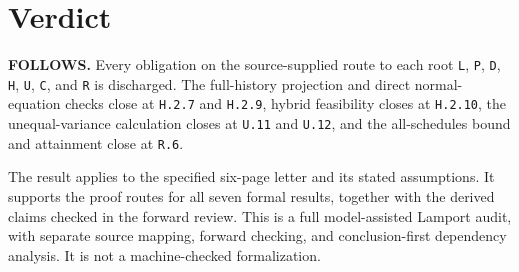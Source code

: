 \documentclass[11pt,letterpaper]{article}
\begin{document}
\section{Verdict}
\textbf{FOLLOWS.} Every obligation on the source-supplied route to each root \texttt{L}, \texttt{P}, \texttt{D}, \texttt{H}, \texttt{U}, \texttt{C}, and \texttt{R} is discharged. The full-history projection and direct normal-equation checks close at \texttt{H.2.7} and \texttt{H.2.9}, hybrid feasibility closes at \texttt{H.2.10}, the unequal-variance calculation closes at \texttt{U.11} and \texttt{U.12}, and the all-schedules bound and attainment close at \texttt{R.6}.

The result applies to the specified six-page letter and its stated assumptions. It supports the proof routes for all seven formal results, together with the derived claims checked in the forward review. This is a full model-assisted Lamport audit, with separate source mapping, forward checking, and conclusion-first dependency analysis. It is not a machine-checked formalization.
\end{document}
